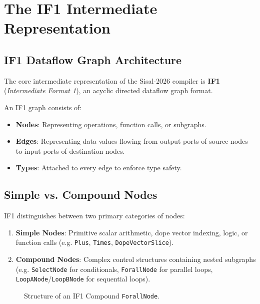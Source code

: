 \chapter{The IF1 Intermediate Representation}
\label{chap:if1_ir}

\section{IF1 Dataflow Graph Architecture}
The core intermediate representation of the Sisal-2026 compiler is \textbf{IF1} (\emph{Intermediate Format 1}), an acyclic directed dataflow graph format.

An IF1 graph consists of:
\begin{itemize}
    \item \textbf{Nodes}: Representing operations, function calls, or subgraphs.
    \item \textbf{Edges}: Representing data values flowing from output ports of source nodes to input ports of destination nodes.
    \item \textbf{Types}: Attached to every edge to enforce type safety.
\end{itemize}

\section{Simple vs. Compound Nodes}
IF1 distinguishes between two primary categories of nodes:
\begin{enumerate}
    \item \textbf{Simple Nodes}: Primitive scalar arithmetic, dope vector indexing, logic, or function calls (e.g. \texttt{Plus}, \texttt{Times}, \texttt{DopeVectorSlice}).
    \item \textbf{Compound Nodes}: Complex control structures containing nested subgraphs (e.g. \texttt{SelectNode} for conditionals, \texttt{ForallNode} for parallel loops, \texttt{LoopANode}/\texttt{LoopBNode} for sequential loops).
\end{enumerate}

\begin{figure}[h!]
\centering
{}
\caption{Structure of an IF1 Compound \texttt{ForallNode}.}
\label{fig:if1_compound}
\end{figure}

